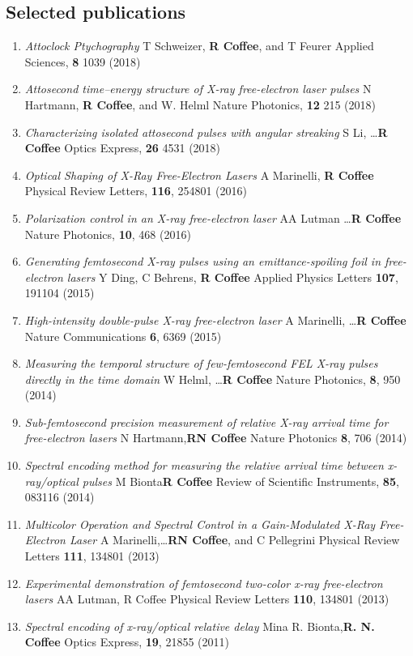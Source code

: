 
\subsection*{Selected publications}
\begin{enumerate}
\item \textit{Attoclock Ptychography}
T Schweizer, \etal \textbf{R Coffee}, and T Feurer 
Applied Sciences, \textbf{8} 1039 (2018)
\item \textit{Attosecond time–energy structure of X-ray free-electron laser pulses}
N Hartmann, \etal \textbf{R Coffee}, and W. Helml
Nature Photonics, \textbf{12} 215 (2018)
\item \textit{Characterizing isolated attosecond pulses with
angular streaking}
S Li, \ldots \textbf{R Coffee}\etal 
Optics Express, \textbf{26} 4531 (2018)
\item \textit{Optical Shaping of X-Ray Free-Electron Lasers}
A Marinelli, \textbf{R Coffee}\etal
Physical Review Letters, \textbf{116}, 254801 (2016)
\item \textit{Polarization control in an X-ray free-electron laser}
AA Lutman \ldots \textbf{R Coffee}\etal 
Nature Photonics, \textbf{10}, 468 (2016)
\item \textit{Generating femtosecond X-ray pulses using an emittance-spoiling foil in free-electron lasers}
Y Ding, C Behrens, \textbf{R Coffee}\etal
Applied Physics Letters \textbf{107}, 191104 (2015)
\item \textit{High-intensity double-pulse X-ray free-electron laser}
A Marinelli, \ldots \textbf{R Coffee}\etal
Nature Communications \textbf{6}, 6369 (2015)
\item \textit{Measuring the temporal structure of few-femtosecond FEL X-ray pulses directly in the time domain}
W Helml, \ldots \textbf{R Coffee}\etal
Nature Photonics, \textbf{8}, 950 (2014)
\item \textit{Sub-femtosecond precision measurement of relative X-ray arrival time for free-electron lasers}
N Hartmann,\etal \textbf{RN Coffee}
Nature Photonics \textbf{8}, 706 (2014)
\item \textit{Spectral encoding method for measuring the relative arrival time between x-ray/optical pulses}
M Bionta\etal \textbf{R Coffee}
Review of Scientific Instruments, \textbf{85}, 083116 (2014)
\item \textit{Multicolor Operation and Spectral Control in a Gain-Modulated X-Ray Free-Electron Laser}
A Marinelli,\etal\ldots \textbf{RN Coffee}, and C Pellegrini
Physical Review Letters \textbf{111}, 134801 (2013)
\item \textit{Experimental demonstration of femtosecond two-color x-ray free-electron lasers}
AA Lutman, R Coffee\etal
Physical Review Letters \textbf{110}, 134801 (2013)
\item \textit{Spectral encoding of x-ray/optical relative delay}
Mina R. Bionta,\etal \textbf{R. N. Coffee}
Optics Express, \textbf{19}, 21855 (2011)
\end{enumerate}


